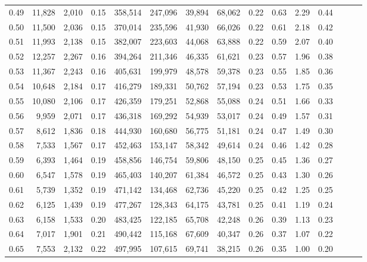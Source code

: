 \begin{tabular}{rrrrrrrrrrrrrrr}
0.49 &  11,828 &  2,010 &  0.15 &  358,514 &  247,096 &   39,894 &   68,062 &  0.22 &  0.63 &  2.29 &      0.44 \\
0.50 &  11,500 &  2,036 &  0.15 &  370,014 &  235,596 &   41,930 &   66,026 &  0.22 &  0.61 &  2.18 &      0.42 \\
0.51 &  11,993 &  2,138 &  0.15 &  382,007 &  223,603 &   44,068 &   63,888 &  0.22 &  0.59 &  2.07 &      0.40 \\
0.52 &  12,257 &  2,267 &  0.16 &  394,264 &  211,346 &   46,335 &   61,621 &  0.23 &  0.57 &  1.96 &      0.38 \\
0.53 &  11,367 &  2,243 &  0.16 &  405,631 &  199,979 &   48,578 &   59,378 &  0.23 &  0.55 &  1.85 &      0.36 \\
0.54 &  10,648 &  2,184 &  0.17 &  416,279 &  189,331 &   50,762 &   57,194 &  0.23 &  0.53 &  1.75 &      0.35 \\
0.55 &  10,080 &  2,106 &  0.17 &  426,359 &  179,251 &   52,868 &   55,088 &  0.24 &  0.51 &  1.66 &      0.33 \\
0.56 &   9,959 &  2,071 &  0.17 &  436,318 &  169,292 &   54,939 &   53,017 &  0.24 &  0.49 &  1.57 &      0.31 \\
0.57 &   8,612 &  1,836 &  0.18 &  444,930 &  160,680 &   56,775 &   51,181 &  0.24 &  0.47 &  1.49 &      0.30 \\
0.58 &   7,533 &  1,567 &  0.17 &  452,463 &  153,147 &   58,342 &   49,614 &  0.24 &  0.46 &  1.42 &      0.28 \\
0.59 &   6,393 &  1,464 &  0.19 &  458,856 &  146,754 &   59,806 &   48,150 &  0.25 &  0.45 &  1.36 &      0.27 \\
0.60 &   6,547 &  1,578 &  0.19 &  465,403 &  140,207 &   61,384 &   46,572 &  0.25 &  0.43 &  1.30 &      0.26 \\
0.61 &   5,739 &  1,352 &  0.19 &  471,142 &  134,468 &   62,736 &   45,220 &  0.25 &  0.42 &  1.25 &      0.25 \\
0.62 &   6,125 &  1,439 &  0.19 &  477,267 &  128,343 &   64,175 &   43,781 &  0.25 &  0.41 &  1.19 &      0.24 \\
0.63 &   6,158 &  1,533 &  0.20 &  483,425 &  122,185 &   65,708 &   42,248 &  0.26 &  0.39 &  1.13 &      0.23 \\
0.64 &   7,017 &  1,901 &  0.21 &  490,442 &  115,168 &   67,609 &   40,347 &  0.26 &  0.37 &  1.07 &      0.22 \\
0.65 &   7,553 &  2,132 &  0.22 &  497,995 &  107,615 &   69,741 &   38,215 &  0.26 &  0.35 &  1.00 &      0.20 \\

\end{tabular}
